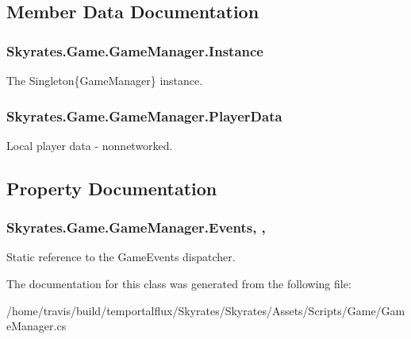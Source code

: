 \subsection{Member Data Documentation}
\hypertarget{class_skyrates_1_1_game_1_1_game_manager_a5b1ce44932689e2e4b3ca18a238cc22e}{
\subsubsection[{Instance}]{ Skyrates.\-Game.\-Game\-Manager.\-Instance\hspace{0.3cm}{\ttfamily [static]}}}\label{class_skyrates_1_1_game_1_1_game_manager_a5b1ce44932689e2e4b3ca18a238cc22e}


The Singleton\{\-Game\-Manager\} instance. 

\hypertarget{class_skyrates_1_1_game_1_1_game_manager_ad66cf44da1b4400f74853a247987a5df}{
\subsubsection[{Player\-Data}]{ Skyrates.\-Game.\-Game\-Manager.\-Player\-Data}}\label{class_skyrates_1_1_game_1_1_game_manager_ad66cf44da1b4400f74853a247987a5df}


Local player data -\/ nonnetworked. 



\subsection{Property Documentation}
\hypertarget{class_skyrates_1_1_game_1_1_game_manager_acb90612bc562f5facb3218201154a35a}{
\subsubsection[{Events}]{ Skyrates.\-Game.\-Game\-Manager.\-Events\hspace{0.3cm}{\ttfamily [static]}, {\ttfamily [get]}, {\ttfamily [set]}}}\label{class_skyrates_1_1_game_1_1_game_manager_acb90612bc562f5facb3218201154a35a}


Static reference to the Game\-Events dispatcher. 



The documentation for this class was generated from the following file\-:\begin{DoxyCompactItemize}
\item 
/home/travis/build/temportalflux/\-Skyrates/\-Skyrates/\-Assets/\-Scripts/\-Game/Game\-Manager.\-cs\end{DoxyCompactItemize}
